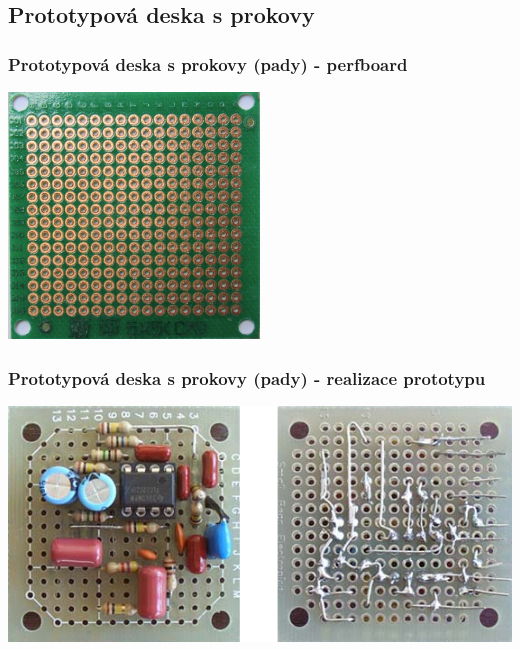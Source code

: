 \documentclass{beamer}
\begin{document}
\subsection{\texorpdfstring{Prototypová deska s prokovy}{Prototypová deska s prokovy}}
  \begin{frame}
    \frametitle{Prototypová deska s prokovy (pady) - perfboard}
    \begin{center}
      \includegraphics[width=0.5\textwidth]{obr/perfBoard_bot.png}
    \end{center}
  \end{frame}
  \begin{frame}
    \frametitle{Prototypová deska s prokovy (pady) - realizace prototypu}
    \begin{center}
      \includegraphics[width=\textwidth]{obr/perfBoard_prot.png}
    \end{center}
  \end{frame}
\end{document}
